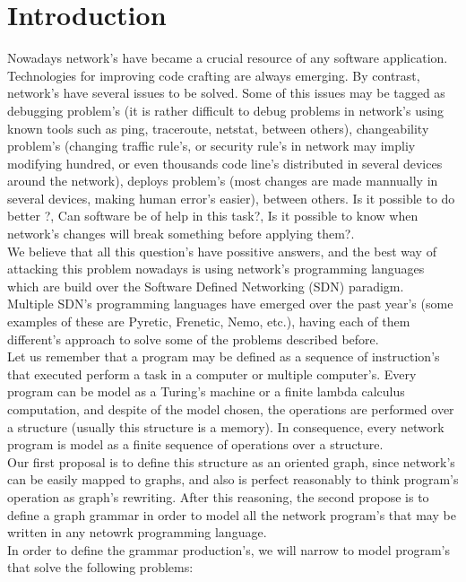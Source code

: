\documentclass[envcountsect,runningheads]{llncs}
\begin{document}
\section{Introduction}
Nowadays network's have became a crucial resource of any software application. 
Technologies for improving code crafting are always emerging. By contrast, network's have 
several issues to be solved. Some of this issues may be tagged as debugging problem's (it is 
rather difficult to debug problems in network's using known tools such as 
ping, traceroute, netstat, between others), changeability problem's (changing traffic rule's, or 
security rule's in network may impliy modifying hundred, or even thousands code line's 
distributed in several devices around the network), deploys problem's (most 
changes are made mannually in several devices, making human error's easier),  between 
others. Is it possible to do better ?, Can software be of help in this task?, Is it possible to know 
when network's changes will break something before applying them?. \\
We believe that all this question's have possitive answers, and the best way of 
attacking this problem nowadays is using network's programming languages which are 
build over the Software Defined Networking (SDN) paradigm.\\
Multiple SDN's programming languages have emerged over the past year's (some examples 
of these are Pyretic, Frenetic, Nemo, etc.), having each of them different's approach to solve 
some of the problems described before. \\
Let us remember that a program may be defined as a sequence of instruction's that executed 
perform a task in a computer or multiple computer's. Every program can be model as a Turing's 
machine or a finite lambda calculus computation, and despite of the model chosen, the operations are performed over a structure (usually this 
structure is a memory). In consequence, every network program is model as a 
finite sequence of operations over a structure.\\
Our first proposal is to define this structure as an oriented graph, since network's 
can be easily mapped to graphs, and also is perfect reasonably to think 
program's operation as graph's rewriting. After this reasoning, the second propose is to define
a graph grammar in order to model all the network program's that may be written in any netowrk
programming language. \\
In order to define the grammar production's, we will narrow to model 
program's that solve the following problems:\\
\end{document}
